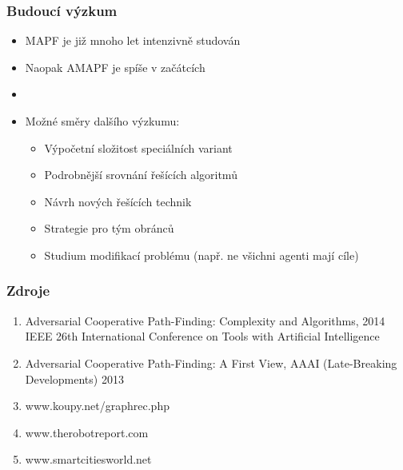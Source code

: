 \documentclass[aspectratio=169,t,xcolor=table]{beamer}
\begin{document}
\begin{frame}
\frametitle{Budoucí výzkum}
\begin{itemize}
    \item[] MAPF je již mnoho let intenzivně studován
    \item[] Naopak AMAPF je spíše v začátcích
    \item[] 
    \item[] Možné směry dalšího výzkumu:
    
        \begin{itemize}
        \item Výpočetní složitost speciálních variant
        \item Podrobnější srovnání řešících algoritmů
        \item Návrh nových řešících technik
        \item Strategie pro tým obránců
	\item Studium modifikací problému (např. ne všichni agenti mají cíle)
        \end{itemize}
\end{itemize}
\end{frame}
\begin{frame}
	\frametitle{Zdroje}
	\begin{enumerate}
		\item Adversarial Cooperative Path-Finding: Complexity and Algorithms, 2014 IEEE 26th International Conference on Tools with Artificial Intelligence
		\item Adversarial Cooperative Path-Finding: A First View, AAAI (Late-Breaking Developments) 2013
		\item www.koupy.net/graphrec.php
		\item www.therobotreport.com
		\item www.smartcitiesworld.net
	\end{enumerate}

\end{frame}
\end{document}
